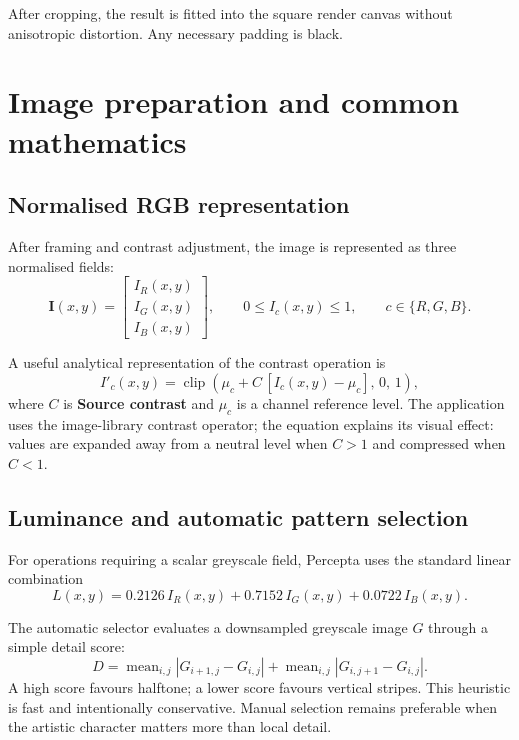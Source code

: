 \documentclass[10.5pt,a4paper]{article}
\newcommand{\clip}{\operatorname{clip}}
\newcommand{\mean}{\operatorname{mean}}
\begin{document}
After cropping, the result is fitted into the square render canvas without anisotropic distortion. Any necessary padding is black.

\section{Image preparation and common mathematics}
\subsection{Normalised RGB representation}
After framing and contrast adjustment, the image is represented as three normalised fields:
\begin{equation}
\mathbf{I}(x,y)=
\begin{bmatrix}
I_R(x,y)\\[2pt] I_G(x,y)\\[2pt] I_B(x,y)
\end{bmatrix},
\qquad 0\le I_c(x,y)\le 1,
\qquad c\in\{R,G,B\}.
\end{equation}

A useful analytical representation of the contrast operation is
\begin{equation}
I'_c(x,y)=\clip\!\left(\mu_c+C\,[I_c(x,y)-\mu_c],\,0,\,1\right),
\end{equation}
where $C$ is \textbf{Source contrast} and $\mu_c$ is a channel reference level. The application uses the image-library contrast operator; the equation explains its visual effect: values are expanded away from a neutral level when $C>1$ and compressed when $C<1$.

\subsection{Luminance and automatic pattern selection}
For operations requiring a scalar greyscale field, Percepta uses the standard linear combination
\begin{equation}
L(x,y)=0.2126\,I_R(x,y)+0.7152\,I_G(x,y)+0.0722\,I_B(x,y).
\end{equation}

The automatic selector evaluates a downsampled greyscale image $G$ through a simple detail score:
\begin{equation}
D=\mean_{i,j}\left|G_{i+1,j}-G_{i,j}\right|
 +\mean_{i,j}\left|G_{i,j+1}-G_{i,j}\right|.
\end{equation}
A high score favours halftone; a lower score favours vertical stripes. This heuristic is fast and intentionally conservative. Manual selection remains preferable when the artistic character matters more than local detail.
\end{document}
